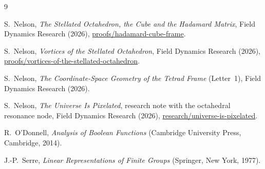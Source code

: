 \documentclass[twocolumn]{iopjournal}
\theoremstyle{definition}
\theoremstyle{remark}
\begin{document}
\begin{thebibliography}{9}

S.~Nelson,
\textit{The Stellated Octahedron, the Cube and the Hadamard Matrix},
Field Dynamics Research (2026),
\url{proofs/hadamard-cube-frame}.

S.~Nelson,
\textit{Vortices of the Stellated Octahedron},
Field Dynamics Research (2026),
\url{proofs/vortices-of-the-stellated-octahedron}.

S.~Nelson,
\textit{The Coordinate-Space Geometry of the Tetrad Frame} (Letter~1),
Field Dynamics Research (2026).

S.~Nelson,
\textit{The Universe Is Pixelated}, research note with the octahedral
resonance node, Field Dynamics Research (2026),
\url{research/universe-is-pixelated}.

R.~O'Donnell,
\textit{Analysis of Boolean Functions}
(Cambridge University Press, Cambridge, 2014).

J.-P.~Serre,
\textit{Linear Representations of Finite Groups}
(Springer, New York, 1977).

\end{thebibliography}
\end{document}
